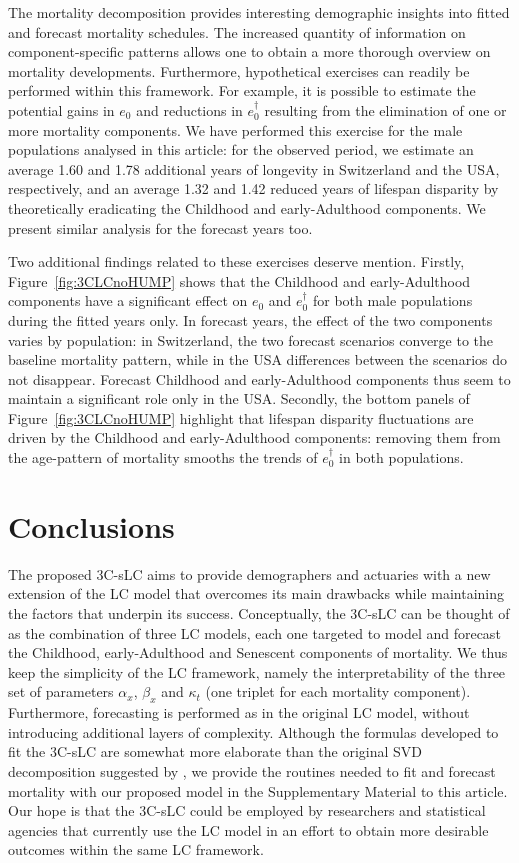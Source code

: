 \documentclass[Thesis]{subfiles}
\begin{document}
The mortality decomposition provides interesting demographic insights into fitted and forecast mortality schedules. The increased quantity of information on component-specific patterns allows one to obtain a more thorough overview on mortality developments. Furthermore, hypothetical exercises can readily be performed within this framework. For example, it is possible to estimate the potential gains in $e_0$ and reductions in $e^{\dagger}_0$ resulting from the elimination of one or more mortality components. We have performed this exercise for the male populations analysed in this article: for the observed period, we estimate an average 1.60 and 1.78 additional years of longevity in Switzerland and the USA, respectively, and an average 1.32 and 1.42 reduced years of lifespan disparity by theoretically eradicating the Childhood and early-Adulthood components. We present similar analysis for the forecast years too.

Two additional findings related to these exercises deserve mention. Firstly, Figure~\ref{fig:3CLCnoHUMP} shows that the Childhood and early-Adulthood components have a significant effect on $e_0$ and $e^{\dagger}_0$ for both male populations during the fitted years only. In forecast years, the effect of the two components varies by population: in Switzerland, the two forecast scenarios converge to the baseline mortality pattern, while in the USA differences between the scenarios do not disappear. Forecast Childhood and early-Adulthood components thus seem to maintain a significant role only in the USA. Secondly, the bottom panels of Figure~\ref{fig:3CLCnoHUMP} highlight that lifespan disparity fluctuations are driven by the Childhood and early-Adulthood components: removing them from the age-pattern of mortality smooths the trends of  $e^{\dagger}_0$ in both populations. 


\section{Conclusions}\label{Sec:Ch6sec5}

The proposed 3C-sLC aims to provide demographers and actuaries with a new extension of the LC model that overcomes its main drawbacks while maintaining the factors that underpin its success. Conceptually, the 3C-sLC can be thought of as the combination of three LC models, each one targeted to model and forecast the Childhood, early-Adulthood and Senescent components of mortality. We thus keep the simplicity of the LC framework, namely the interpretability of the three set of parameters $\alpha_x$, $\beta_{x}$ and $\kappa_{t}$ (one triplet for each mortality component). Furthermore, forecasting is performed as in the original LC model, without introducing additional layers of complexity. Although the formulas developed to fit the 3C-sLC are somewhat more elaborate than the original SVD decomposition suggested by \cite{lee1992modeling}, we provide the routines needed to fit and forecast mortality with our proposed model in the Supplementary Material to this article. Our hope is that the 3C-sLC could be employed by researchers and statistical agencies that currently use the LC model in an effort to obtain more desirable outcomes within the same LC framework.

\cleardoublepage
\end{document}
